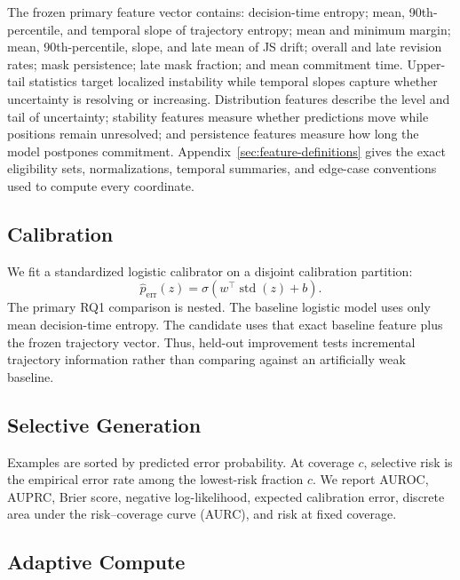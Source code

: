 \documentclass[10pt]{article}
\newcommand{\calp}{\widehat{p}_{\mathrm{err}}}
\begin{document}
The frozen primary feature vector contains:
decision-time entropy; mean, 90th-percentile, and temporal slope of trajectory entropy; mean and minimum margin; mean, 90th-percentile, slope, and late mean of JS drift; overall and late revision rates; mask persistence; late mask fraction; and mean commitment time.
Upper-tail statistics target localized instability while temporal slopes capture whether uncertainty is resolving or increasing.
Distribution features describe the level and tail of uncertainty; stability
features measure whether predictions move while positions remain unresolved;
and persistence features measure how long the model postpones commitment.
Appendix~\ref{sec:feature-definitions} gives the exact eligibility sets,
normalizations, temporal summaries, and edge-case conventions used to compute
every coordinate.

\subsection{Calibration}

We fit a standardized logistic calibrator on a disjoint calibration partition:
\begin{equation}
\calp(z)=\sigma\!\left(w^\top \operatorname{std}(z)+b\right).
\end{equation}
The primary RQ1 comparison is nested.
The baseline logistic model uses only mean decision-time entropy.
The candidate uses that exact baseline feature plus the frozen trajectory vector.
Thus, held-out improvement tests incremental trajectory information rather than comparing against an artificially weak baseline.

\subsection{Selective Generation}

Examples are sorted by predicted error probability.
At coverage $c$, selective risk is the empirical error rate among the lowest-risk fraction $c$.
We report AUROC, AUPRC, Brier score, negative log-likelihood, expected calibration error, discrete area under the risk--coverage curve (AURC), and risk at fixed coverage.

\subsection{Adaptive Compute}
\end{document}
